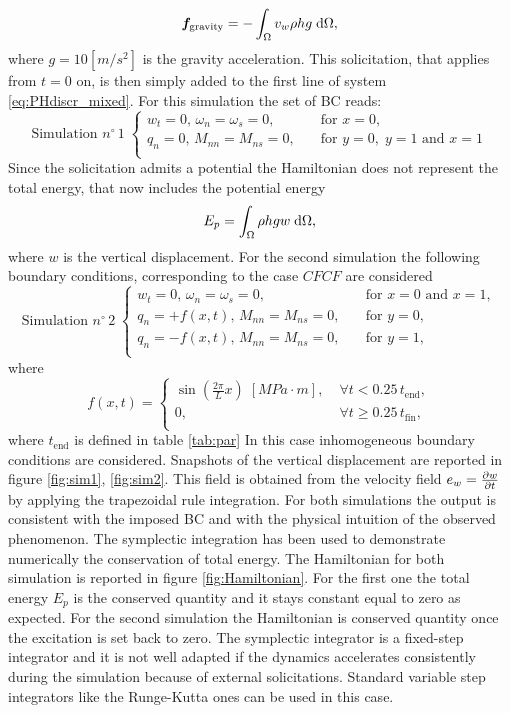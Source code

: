 \documentclass[preprint,12pt]{elsarticle}
\begin{document}
{\[\bm{f}_{\text{gravity}} = - \int_{\Omega} v_w \rho h g \d{\Omega},
\]
where $g = 10 [m/s^2]$ is the gravity acceleration. This solicitation, that applies from $t=0$ on, is then simply added to the first line of system \eqref{eq:PHdiscr_mixed}.
For this simulation the set of BC reads:
\begin{equation*} \text{Simulation $n^\circ \, 1$} \;
\begin{cases}
w_t = 0, \, \omega_n = \omega_s= 0,  \quad &\text{for } x=0, \\
q_n = 0, \, M_{nn} = M_{ns}= 0, \quad &\text{for } y=0, \; y=1 \text{ and } x=1\\
\end{cases}
\end{equation*}
Since the solicitation admits a potential the Hamiltonian does not represent the total energy, that now includes the potential energy
\begin{equation*}
E_p = \int_{\Omega} \rho h g w \d{\Omega}, 
\end{equation*}
where $w$ is the vertical displacement. For the second simulation the following  boundary conditions, corresponding to the case $CFCF$ are considered
\begin{equation*} \text{Simulation $n^\circ \, 2$} \;
	\begin{cases}
	w_t = 0, \, \omega_n = \omega_s= 0, \quad &\text{for } x=0 \text{ and } x=1,\\
    q_n = +f(x, t), \, M_{nn} = M_{ns}= 0, \quad &\text{for } y=0,\\
	q_n = -f(x, t), \, M_{nn} = M_{ns}= 0, \quad &\text{for } y=1,\\
	\end{cases}
\end{equation*}
where 
\begin{equation*}
f(x, t) = \begin{cases}
\sin \left( \frac{2 \pi}{L} x \right) \; [MPa \cdot m], \; &\forall t< 0.25 \, t_{\text{end}}, \\
0, \; &\forall t\geq 0.25 \, t_{\text{fin}}, \\
\end{cases}
\end{equation*} 
where $t_{\text{end}}$ is defined in table \ref{tab:par}
In this case inhomogeneous boundary conditions are considered. Snapshots of the vertical displacement are reported in figure \ref{fig:sim1}, \ref{fig:sim2}. This field is obtained from the velocity field $e_w = \diffp{w}{t}$ by applying the trapezoidal rule integration. For both simulations the output is consistent with the imposed BC and with the physical intuition of the observed phenomenon. The symplectic integration has been used to demonstrate numerically the conservation of total energy. The Hamiltonian for both simulation is reported in figure \ref{fig:Hamiltonian}. For the first one the total energy $E_p$ is the conserved quantity and it stays constant equal to zero as expected. For the second simulation the Hamiltonian is conserved quantity once the excitation is set back to zero. The symplectic integrator is a fixed-step integrator and it is not well adapted if the dynamics accelerates consistently during the simulation because of external solicitations. Standard variable step integrators like the Runge-Kutta ones can be used in this case.
}
\end{document}
